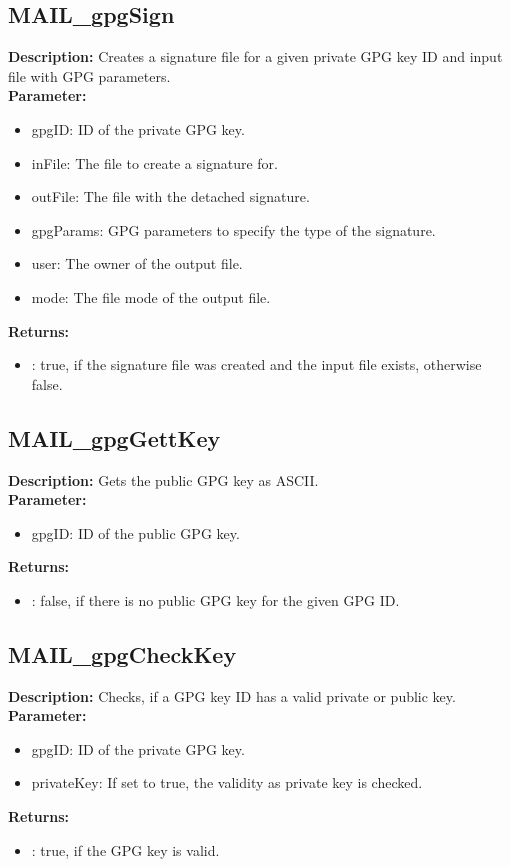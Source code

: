 \subsection{MAIL\_gpgSign}
\textbf{Description:} Creates a signature file for a given private GPG key ID and input file with GPG parameters.\\
\textbf{Parameter:}
\begin{itemize}
\item gpgID: ID of the private GPG key.
\item inFile: The file to create a signature for.
\item outFile: The file with the detached signature.
\item gpgParams: GPG parameters to specify the type of the signature.
\item user: The owner of the output file.
\item mode: The file mode of the output file.
\end{itemize}
\textbf{Returns:}
\begin{itemize}
\item : true, if the signature file was created and the input file exists, otherwise false.
\end{itemize}

\subsection{MAIL\_gpgGettKey}
\textbf{Description:} Gets the public GPG key as ASCII.\\
\textbf{Parameter:}
\begin{itemize}
\item gpgID: ID of the public GPG key.
\end{itemize}
\textbf{Returns:}
\begin{itemize}
\item : false, if there is no public GPG key for the given GPG ID.
\end{itemize}

\subsection{MAIL\_gpgCheckKey}
\textbf{Description:} Checks, if a GPG key ID has a valid private or public key.\\
\textbf{Parameter:}
\begin{itemize}
\item gpgID: ID of the private GPG key.
\item privateKey: If set to true, the validity as private key is checked.
\end{itemize}
\textbf{Returns:}
\begin{itemize}
\item : true, if the GPG key is valid.
\end{itemize}

